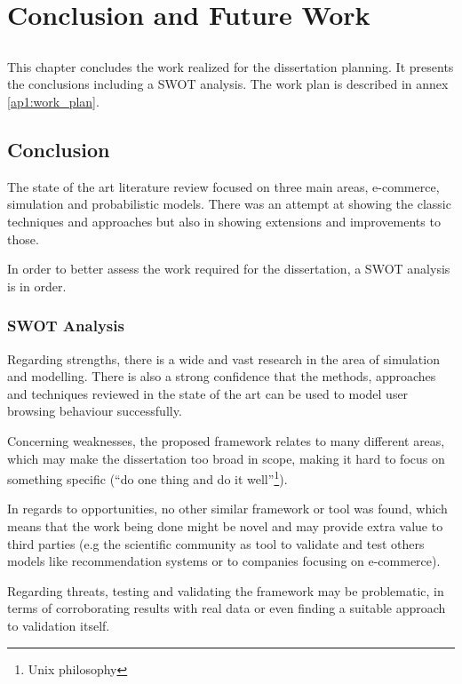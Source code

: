\chapter{Conclusion and Future Work} \label{chap:conclusion}

\section*{}

This chapter concludes the work realized for the dissertation planning. It 
presents the conclusions including a SWOT analysis. The work plan is described 
in annex \ref{ap1:work_plan}.

\section{Conclusion}

The state of the art literature review focused on three main areas, e-commerce, 
simulation and probabilistic models. There was an attempt at showing the 
classic techniques and approaches but also in showing extensions and 
improvements to those.

In order to better assess the work required for the dissertation, a SWOT 
analysis is in order.

\subsection{SWOT Analysis}

Regarding strengths, there is a wide and vast research in the area of 
simulation and modelling. There is also a strong confidence that the methods, 
approaches and techniques reviewed in the state of the art can be used to model 
user browsing behaviour successfully.

Concerning weaknesses, the proposed framework relates to many different areas, 
which may make the dissertation too broad in scope, making it hard to focus on 
something specific (``do one thing and do it well''\footnote{Unix philosophy}).

In regards to opportunities, no other similar framework or tool was found, 
which means that the work being done might be novel and may provide extra value 
to third parties (e.g the scientific community as tool to validate and test 
others models like recommendation systems or to companies focusing on 
e-commerce).

Regarding threats, testing and validating the framework may be problematic, in 
terms of corroborating results with real data or even finding a suitable 
approach to validation itself.
